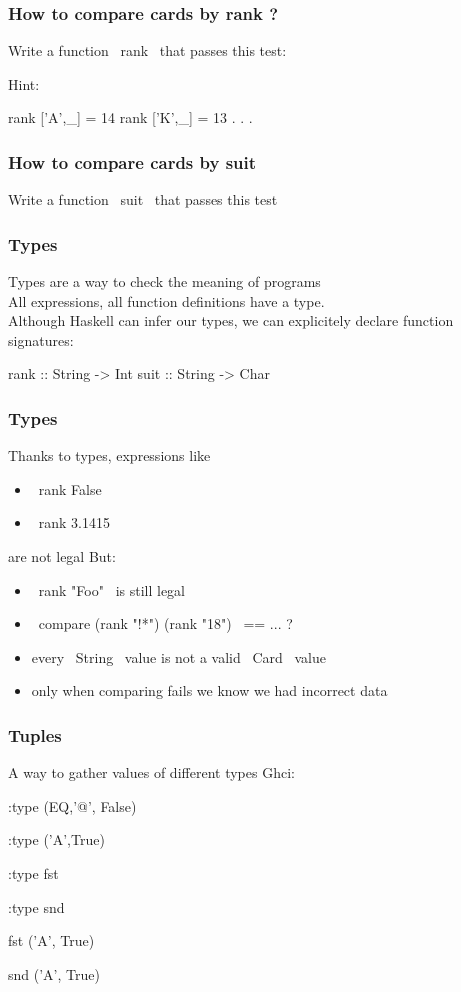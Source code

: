 \documentclass[11pt,xcolor={dvipsnames}]{beamer}
\newcommand{\tc}{\textcolor}
\newcommand{\key}[1]{\tc{orange}{#1}}
\newcommand{\rk}{\enskip{\key{$\hookleftarrow$}}}
\newcommand{\vs}{\vspace{1em}}
\newcommand{\lstT}[1]{}
\begin{document}
\begin{frame}[fragile]
\frametitle{How to compare cards by rank ?}
Write a function ~rank~ that passes this test:
\vs
\lstT{017}
Hint:
\begin{haskell}
rank ['A',_] = 14
rank ['K',_] = 13
    . . .
\end{haskell}
\end{frame}
\begin{frame}[fragile]
\frametitle{How to compare cards by suit}
Write a function ~suit~ that passes this test
\vs
\lstT{018}
\end{frame}
\begin{frame}[fragile]
\frametitle{Types}
Types are a way to check the meaning of programs\\
All expressions, all function definitions have a type.\\
Although Haskell can infer our types, we can explicitely declare function signatures:
\vs
\begin{haskell}
rank :: String -> Int
suit :: String -> Char
\end{haskell}
\end{frame}
\begin{frame}[fragile]
\frametitle{Types}
Thanks to types, expressions like
\begin{itemize}
\item  ~rank False~ 
\item  ~rank 3.1415~ 
\end{itemize}
are not legal
\vs
But:
\begin{itemize}
\item  ~rank "Foo"~ is still legal
\item  ~compare (rank "!*") (rank "18")~ == ... ?
\item  every ~String~ value is not a valid ~Card~ value
\item  only when comparing fails we know we had incorrect data
\end{itemize}
\end{frame}
\begin{frame}[fragile]
\frametitle{Tuples}
A way to gather values of different types
\vs
Ghci:
\begin{term}
:type (EQ,'@', False)\rk

:type ('A',True)\rk

:type fst\rk

:type snd\rk

fst ('A', True)\rk

snd ('A', True) \rk
\end{term}
\end{frame}
\end{document}
